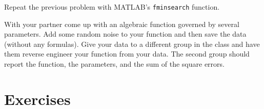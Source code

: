 \begin{problem}
    Repeat the previous problem with MATLAB's \texttt{fminsearch} function.
\end{problem}

\begin{problem}
    With your partner come up with an algebraic function governed by several parameters.
    Add some random noise to your function and then save the data (without any formulas).
    Give your data to a different group in the class and have them reverse engineer your
    function from your data.  The second group should report the function, the parameters,
    and the sum of the square errors.
\end{problem}





\newpage\section{Exercises}

